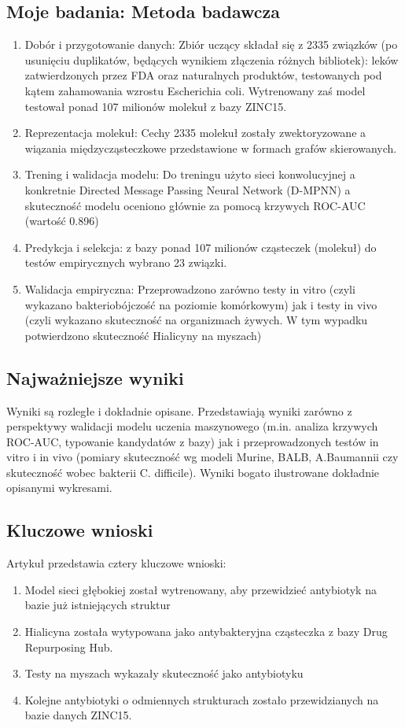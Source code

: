 \subsection{Moje badania: Metoda badawcza}
\begin{enumerate}
    \item Dobór i przygotowanie danych: Zbiór uczący składał się z 2335 związków (po usunięciu duplikatów, będących wynikiem złączenia różnych bibliotek): leków zatwierdzonych przez FDA oraz naturalnych produktów, testowanych pod kątem zahamowania wzrostu Escherichia coli. Wytrenowany zaś model testował ponad 107 milionów molekuł z bazy ZINC15.
    \item Reprezentacja molekuł: Cechy 2335 molekuł zostały zwektoryzowane a wiązania międzycząsteczkowe przedstawione w formach grafów skierowanych.
    \item Trening i walidacja modelu: Do treningu użyto sieci konwolucyjnej a konkretnie Directed Message Passing Neural Network (D-MPNN) a skuteczność modelu oceniono głównie za pomocą krzywych ROC-AUC (wartość 0.896)
    \item Predykcja i selekcja: z bazy ponad 107 milionów cząsteczek (molekuł) do testów empirycznych wybrano 23 związki.
    \item Walidacja empiryczna: Przeprowadzono zarówno testy in vitro (czyli wykazano bakteriobójczość na poziomie komórkowym) jak i testy in vivo (czyli wykazano skuteczność na organizmach żywych. W tym wypadku potwierdzono skuteczność Hialicyny na myszach)
\end{enumerate}


\subsection{Najważniejsze wyniki}
Wyniki są rozległe i dokładnie opisane. Przedstawiają wyniki zarówno z perspektywy walidacji modelu uczenia maszynowego (m.in. analiza krzywych ROC-AUC, typowanie kandydatów z bazy) jak i przeprowadzonych testów in vitro i in vivo (pomiary skuteczność wg modeli Murine, BALB, A.Baumannii czy skuteczność wobec bakterii C. difficile). Wyniki bogato ilustrowane dokładnie opisanymi wykresami.

\subsection{Kluczowe wnioski}
Artykuł przedstawia cztery kluczowe wnioski:
\begin{enumerate}
    \item Model sieci głębokiej został wytrenowany, aby przewidzieć antybiotyk na bazie już istniejących struktur
    \item Hialicyna została wytypowana jako antybakteryjna cząsteczka z bazy Drug Repurposing Hub.
    \item Testy na myszach wykazały skuteczność jako antybiotyku
    \item Kolejne antybiotyki o odmiennych strukturach zostało przewidzianych na bazie danych ZINC15.
\end{enumerate}


